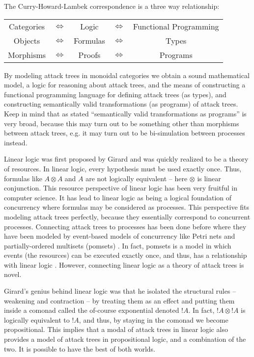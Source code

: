 \documentclass{llncs}
\begin{document}
The Curry-Howard-Lambek correspondence is a three way relationship:
\begin{center}
  \footnotesize
  \setlength{\tabcolsep}{7pt}
  \begin{tabular}{ccccc}
    Categories & $\iff$ & Logic    & $\iff$   & Functional Programming\\
    Objects    & $\iff$ & Formulas & $\iff$   & Types    \\
    Morphisms  & $\iff$ & Proofs   & $\iff$   & Programs 
  \end{tabular}
\end{center}
By modeling attack trees in monoidal categories we obtain a sound
mathematical model, a logic for reasoning about attack trees, and the
means of constructing a functional programming language for defining
attack trees (as types), and constructing semantically valid
transformations (as programs) of attack trees.  Keep in mind that as
stated ``semantically valid transformations as programs'' is very
broad, because this may turn out to be something other than morphisms
between attack trees, e.g. it may turn out to be bi-simulation between
processes instead.

Linear logic was first proposed by Girard \cite{Girard:1987} and was
quickly realized to be a theory of resources.  In linear logic, every
hypothesis must be used exactly once.  Thus, formulas like $A \otimes
A$ and $A$ are not logically equivalent -- here $\otimes$ is linear
conjunction.  This resource perspective of linear logic has been very
fruitful in computer science.  It has lead to linear logic as being a
logical foundation of concurrency where formulas may be considered as
processes.  This perspective fits modeling attack trees perfectly,
because they essentially correspond to concurrent processes.
Connecting attack trees to processes has been done before where they
have been modeled by event-based models of concurrency like Petri nets
and partially-ordered multisets (pomsets)
\cite{Jhawar:2015,Mauw:2006}.  In fact, pomsets is a model in which
events (the resources) can be executed exactly once, and thus, has a
relationship with linear logic \cite{Retore:1997}.  However,
connecting linear logic as a theory of attack trees is novel.

Girard's genius behind linear logic was that he isolated the
structural rules -- weakening and contraction -- by treating them as
an effect and putting them inside a comonad called the of-course
exponential denoted $!A$.  In fact, $!A \otimes !A$ is logically
equivalent to $!A$, and thus, by staying in the comonad we become
propositional.  This implies that a modal of attack trees in linear
logic also provides a model of attack trees in propositional logic,
and a combination of the two.  It is possible to have the best of both
worlds.
\end{document}
